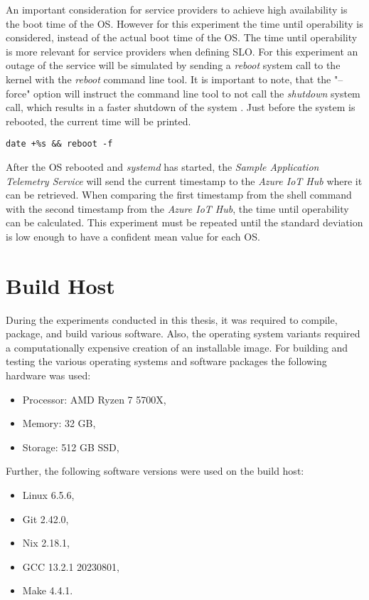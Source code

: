 An important consideration for service providers to achieve high
availability is the boot time of the \ac{OS}. However for this experiment the
time until operability is considered, instead of the actual boot time of the
\ac{OS}. The time until operability is more relevant for service providers
when defining \ac{SLO}.
For this experiment an outage of the service will be simulated by sending a
\textit{reboot} system call to the kernel with the \textit{reboot}
command line tool. It is important to note, that the "--force" option will
instruct the command line tool to not call the \textit{shutdown} system call,
which results in a faster shutdown of the system \cite{man-reboot}\cite{man-shutdown}.
Just before the system is rebooted, the current time will be printed.
\\

\begin{lstlisting}[caption=Command to print the current time and reboot]
date +%s && reboot -f
\end{lstlisting}
After the \ac{OS} rebooted and \textit{systemd} has started, the
\textit{Sample Application Telemetry Service} will send the current timestamp
to the \textit{Azure IoT Hub} where it can be retrieved. When comparing
the first timestamp from the shell command with the second timestamp from
the \textit{Azure IoT Hub}, the time until operability can be calculated.
This experiment must be repeated until the standard deviation is low enough
to have a confident mean value for each \ac{OS}.



\section{Build Host}
During the experiments conducted in this thesis, it was
required to compile, package, and build various software.
Also, the operating system variants required a
computationally expensive creation of an installable image.
For building and testing the various operating systems and
software packages the following hardware was used:
\begin{itemize}
    \item Processor: AMD Ryzen 7 5700X,
    \item Memory: 32 GB,
    \item Storage: 512 GB SSD,
\end{itemize}

Further, the following software versions were used on the build host:
\begin{itemize}
    \item Linux 6.5.6,
    \item Git 2.42.0,
    \item Nix 2.18.1,
    \item GCC 13.2.1 20230801,
    \item Make 4.4.1.
\end{itemize}
